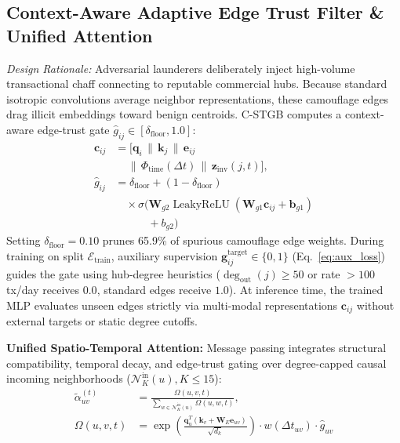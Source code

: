 \subsection{Context-Aware Adaptive Edge Trust Filter \& Unified Attention}
\label{sec:edge_trust_filter}
\textit{Design Rationale:} Adversarial launderers deliberately inject high-volume transactional chaff connecting to reputable commercial hubs. Because standard isotropic convolutions average neighbor representations, these camouflage edges drag illicit embeddings toward benign centroids. C-STGB computes a context-aware edge-trust gate $\hat{g}_{ij} \in [\delta_{\text{floor}}, 1.0]$:
\begin{align}
\mathbf{c}_{ij} &= [ \mathbf{q}_i \,\|\, \mathbf{k}_j \,\|\, \mathbf{e}_{ij} \nonumber \\
&\quad \,\|\, \Phi_{\text{time}}(\Delta t) \,\|\, \mathbf{z}_{\text{inv}}(j, t) ], \label{eq:edge_trust_gate} \\
\hat{g}_{ij} &= \delta_{\text{floor}} + (1 - \delta_{\text{floor}}) \nonumber \\
&\quad \times \sigma\big( \mathbf{W}_{g2} \operatorname{LeakyReLU}( \mathbf{W}_{g1} \mathbf{c}_{ij} + \mathbf{b}_{g1} ) \nonumber \\
&\qquad\quad + b_{g2} \big)
\end{align}
Setting $\delta_{\text{floor}} = 0.10$ prunes 65.9\% of spurious camouflage edge weights. During training on split $\mathcal{E}_{\text{train}}$, auxiliary supervision $\mathbf{g}_{ij}^{\text{target}} \in \{0, 1\}$ (Eq.~\ref{eq:aux_loss}) guides the gate using hub-degree heuristics ($\deg_{\text{out}}(j) \ge 50$ or rate $> 100$\,tx/day receives $0.0$, standard edges receive $1.0$). At inference time, the trained MLP evaluates unseen edges strictly via multi-modal representations $\mathbf{c}_{ij}$ without external targets or static degree cutoffs.

\textbf{Unified Spatio-Temporal Attention:} Message passing integrates structural compatibility, temporal decay, and edge-trust gating over degree-capped causal incoming neighborhoods ($\mathcal{N}_K^{\text{in}}(u), K \le 15$):
\begin{align}
\tilde{\alpha}_{uv}^{(t)} &= \frac{\Omega(u, v, t)}{\sum_{w \in \mathcal{N}_K^{\text{in}}(u)} \Omega(u, w, t)}, \\
\Omega(u, v, t) &= \exp\left(\tfrac{\mathbf{q}_u^T (\mathbf{k}_v + \mathbf{W}_E \mathbf{e}_{uv})}{\sqrt{d_k}}\right) \cdot w(\Delta t_{uv}) \cdot \hat{g}_{uv}
\end{align}

